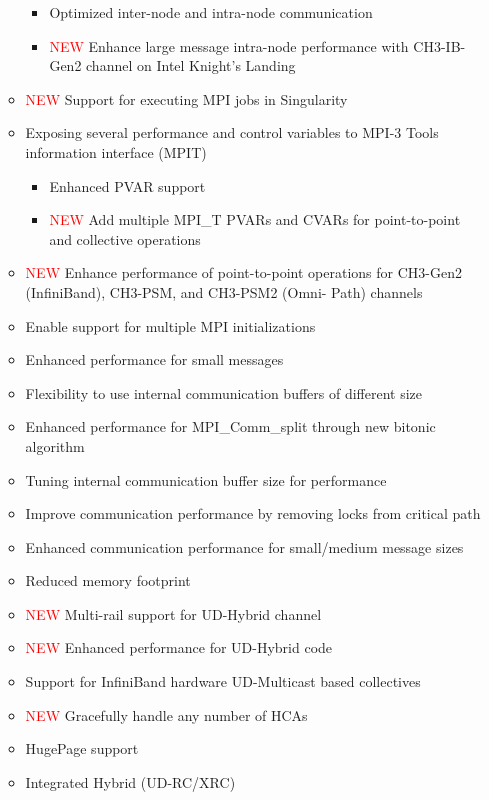 \begin{itemize}
\begin{itemize}
\begin{itemize}
        \item Optimized inter-node and intra-node communication
        \item \textcolor{red}{NEW} Enhance large message intra-node performance with CH3-IB-Gen2 channel on Intel Knight's Landing
      \end{itemize}      
      \item  \textcolor{red}{NEW}  Support for executing MPI jobs in Singularity
      \item  Exposing several performance and control variables to MPI-3 Tools information interface (MPIT)
      \begin{itemize}
        \item  Enhanced PVAR support
        \item \textcolor{red}{NEW} Add multiple MPI\_T PVARs and CVARs for point-to-point and collective operations
      \end{itemize}
      \item  \textcolor{red}{NEW} Enhance performance of point-to-point
          operations for CH3-Gen2 (InfiniBand), CH3-PSM, and CH3-PSM2 (Omni-
          Path) channels
      \item  Enable support for multiple MPI initializations
      \item  Enhanced performance for small messages
      \item Flexibility to use internal communication buffers of different size
      \item  Enhanced performance for MPI\_Comm\_split through new bitonic algorithm
      \item  Tuning internal communication buffer size for performance
      \item Improve communication performance by removing locks from critical path
      \item Enhanced communication performance for small/medium message sizes
      \item  Reduced memory footprint
      \item  \textcolor{red}{NEW} Multi-rail support for UD-Hybrid channel
      \item  \textcolor{red}{NEW} Enhanced performance for UD-Hybrid code
      \item  Support for InfiniBand hardware UD-Multicast based collectives
      \item \textcolor{red}{NEW} Gracefully handle any number of HCAs
      \item  HugePage support
      \item  Integrated Hybrid (UD-RC/XRC) 

\end{itemize}
\end{itemize}
